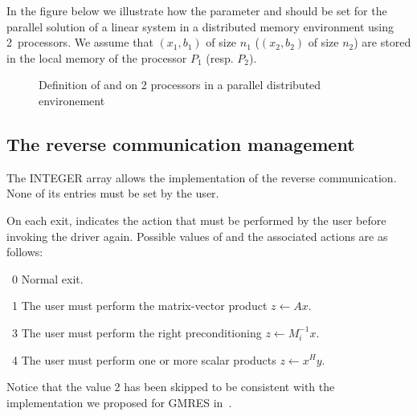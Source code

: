 In the figure below we illustrate how the parameter  and  should be
set for the parallel solution of a linear system in a distributed memory environment using
2~processors.
We assume that $(x_1, b_1)$ of size $n_1$ ($(x_2, b_2)$ of size $n_2$) are stored in the 
local memory of the processor $P_1$ (resp. $P_2$).
\begin{figure}[!htb]
 \begin{center}
 \caption{\label{fig:distrib} Definition of  and  on 2 processors 
    in a parallel distributed environement}
 \end{center}
\end{figure}
%
%
\subsection{The reverse communication management}\label{sec:reverse}
%
The INTEGER array  allows the implementation of the reverse
communication.
None of its entries must be set by the user.

On each exit,  indicates the action that must be performed
by the user before invoking the driver again.
Possible values of  and the associated actions are as follows:
\begin{listparam}
  \item[~0] Normal exit. 
  \item[~1] The user must perform the matrix-vector product 
            $z \leftarrow A x$.
  \item[~3] The user must perform the right preconditioning
            $z \leftarrow M_i^{-1} x$.
  \item[~4] The user must perform one or more scalar products
            $z \leftarrow x^Hy$.
\end{listparam}
 Notice that the value 2 has been skipped to be consistent with the implementation
we proposed for GMRES in~\cite{fggl:03,fggl:05}.

